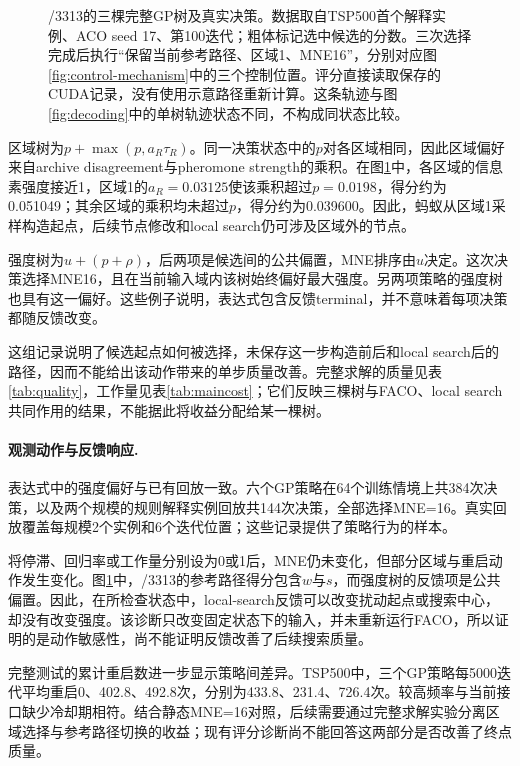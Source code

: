 \begin{figure}[p]
\centering

\caption{\CT{}/3313的三棵完整GP树及真实决策。数据取自TSP500首个解释实例、ACO seed 17、第100迭代；粗体标记选中候选的分数。三次选择完成后执行“保留当前参考路径、区域1、MNE16”，分别对应图\ref{fig:control-mechanism}中的三个控制位置。评分直接读取保存的CUDA记录，没有使用示意路径重新计算。这条轨迹与图\ref{fig:decoding}中的单树轨迹状态不同，不构成同状态比较。}
\label{fig:conditional-decoding}
\end{figure}

区域树为$p+\max(p,a_R\tau_R)$。同一决策状态中的$p$对各区域相同，因此区域偏好来自archive disagreement与pheromone strength的乘积。在图\ref{fig:conditional-decoding}中，各区域的信息素强度接近1，区域1的$a_R=0.03125$使该乘积超过$p=0.0198$，得分约为0.051049；其余区域的乘积均未超过$p$，得分约为0.039600。因此，蚂蚁从区域1采样构造起点，后续节点修改和local search仍可涉及区域外的节点。

强度树为$u+(p+\rho)$，后两项是候选间的公共偏置，MNE排序由$u$决定。这次决策选择MNE16，且在当前输入域内该树始终偏好最大强度。另两项\CT{}策略的强度树也具有这一偏好。这些例子说明，表达式包含反馈terminal，并不意味着每项决策都随反馈改变。

这组记录说明了候选起点如何被选择，未保存这一步构造前后和local search后的路径，因而不能给出该动作带来的单步质量改善。完整求解的质量见表\ref{tab:quality}，工作量见表\ref{tab:maincost}；它们反映三棵树与FACO、local search共同作用的结果，不能据此将收益分配给某一棵树。

\paragraph{观测动作与反馈响应.}
表达式中的强度偏好与已有回放一致。六个GP策略在64个训练情境上共384次决策，以及两个规模的规则解释实例回放共144次决策，全部选择MNE=16。真实回放覆盖每规模2个实例和6个迭代位置；这些记录提供了策略行为的样本。

将停滞、回归率或工作量分别设为0或1后，MNE仍未变化，但部分区域与重启动作发生变化。图\ref{fig:conditional-decoding}中，\CT{}/3313的参考路径得分包含$w$与$s$，而强度树的反馈项是公共偏置。因此，在所检查状态中，local-search反馈可以改变扰动起点或搜索中心，却没有改变强度。该诊断只改变固定状态下的输入，并未重新运行FACO，所以证明的是动作敏感性，尚不能证明反馈改善了后续搜索质量。

完整测试的累计重启数进一步显示策略间差异。TSP500中，\JS{}三个GP策略每5000迭代平均重启0、402.8、492.8次，\CT{}分别为433.8、231.4、726.4次。较高频率与当前接口缺少冷却期相符。结合静态MNE=16对照，后续需要通过完整求解实验分离区域选择与参考路径切换的收益；现有评分诊断尚不能回答这两部分是否改善了终点质量。

